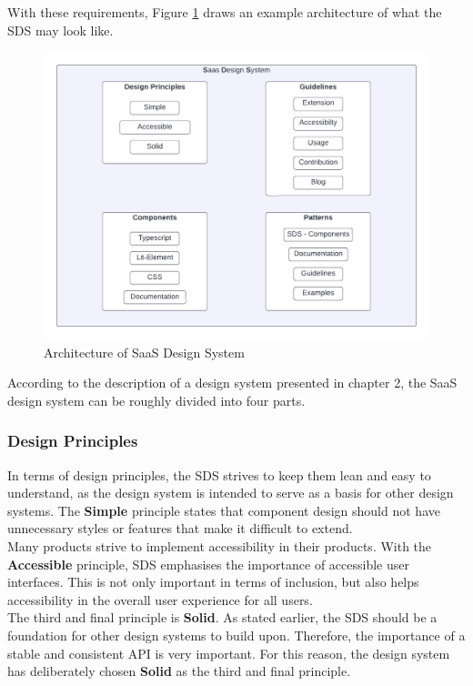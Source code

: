 With these requirements, Figure \ref{architecture_sds} draws an example architecture of what the SDS may look like.\\
\begin{figure}[htbp]
\centerline{\includegraphics[width=\linewidth]{images/architecture_sds.png}}
\caption{Architecture of SaaS Design System}
\label{architecture_sds}
\end{figure}

According to the description of a design system presented in chapter 2, the SaaS design system can be roughly divided into four parts.
\subsubsection{Design Principles}
In terms of design principles, the \ac{SDS} strives to keep them lean and easy to understand, as the design system is intended to serve as a basis for other design systems. The \textbf{Simple} principle states that component design should not have unnecessary styles or features that make it difficult to extend. \\
Many products strive to implement accessibility in their products. With the \textbf{Accessible} principle, \ac{SDS} emphasises the importance of accessible user interfaces. This is not only important in terms of inclusion, but also helps accessibility in the overall user experience for all users. \\
The third and final principle is \textbf{Solid}. As stated earlier, the \ac{SDS} should be a foundation for other design systems to build upon. Therefore, the importance of a stable and consistent API is very important. For this reason, the design system has deliberately chosen \textbf{Solid} as the third and final principle. \\
